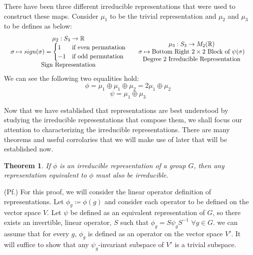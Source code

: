 \documentclass[10pt]{ucthesis}
\newtheorem{theorem}[definition]{Theorem}
\begin{document}
\noindent There have been three different irreducible representations that were used to construct these maps. Consider $\mu_1$ to be the trivial representation and $\mu_2$ and $\mu_3$ to be defines as below:
$$\begin{array}{c c}
	\begin{array}{c}
		\mu_2 : S_3 \rightarrow \mathbb{R} \\
		\sigma \mapsto sign(\sigma) = \begin{cases}
										1 & \text{if even permutation} \\
										-1 & \text{if odd permutation}
									   \end{cases}\\
		\text{Sign Representation}
	\end{array}
&
	\begin{array}{c}
		\mu_3 : S_3 \rightarrow M_2(\mathbb{R}) \\
		\sigma \mapsto \text{Bottom Right } 2\times2 \text{ Block of } \psi(\sigma)\\
		\text{Degree 2 Irreducible Representation}
	\end{array}
\end{array}$$
We can see the following two equalities hold:
$$\phi = \mu_1 \oplus \mu_1 \oplus \mu_2 = 2\mu_1 \oplus \mu_2$$
$$\psi = \mu_1 \oplus \mu_3$$

Now that we have established that representations are best understood by studying the irreducible representations that compose them, we shall focus our attention to characterizing the irreducible representations. There are many theorems and useful corrolaries that we will make use of later that will be established now.

\begin{theorem}
	If $\phi$ is an irreducible representation of a group $G$, then any representation equivalent to $\phi$ must also be irreducible.
\end{theorem}

\noindent (Pf.) For this proof, we will consider the linear operator definition of representations. Let $\phi_g \coloneq \phi(g)$ and consider each operator to be defined on the vector space $V$. Let $\psi$ be defined as an equivalent representation of $G$, so there exists an invertible, linear operator, $S$ such that $\phi_g = S\psi_g S^{-1}$ $\forall g \in G$. we can assume that for every $g$, $\phi_g$ is defined as an operator on the vector space $V'$. It will suffice to show that any $\psi_g$-invariant subspace of $V'$ is a trivial subspace. \\
\end{document}
